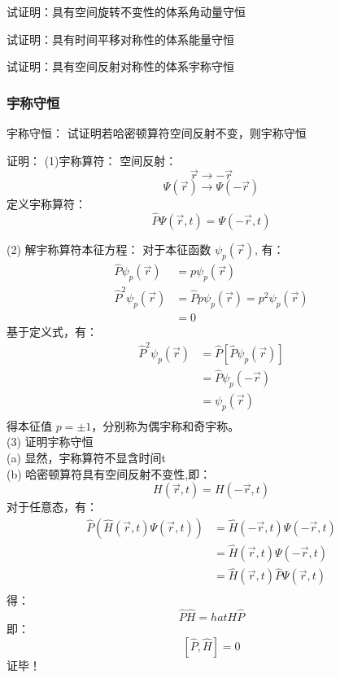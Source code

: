 \begin{frame} [allowframebreaks=]
    \frametitle{} 
    \begin{tcolorbox}[colback=yellow!5,colframe=yellow!75!black,title=角动量守恒：]
        试证明：具有空间旋转不变性的体系角动量守恒                               
    \end{tcolorbox}
    \begin{tcolorbox}[colback=yellow!5,colframe=yellow!75!black,title=能量守恒：]
        试证明：具有时间平移对称性的体系能量守恒                               
    \end{tcolorbox}
    \begin{tcolorbox}[colback=yellow!5,colframe=yellow!75!black,title=宇称守恒：]
        试证明：具有空间反射对称性的体系宇称守恒                             
    \end{tcolorbox}
\end{frame}

\begin{frame} [allowframebreaks=]
    \frametitle{宇称守恒} 
    \begin{tcolorbox1}{宇称守恒：}
        试证明若哈密顿算符空间反射不变，则宇称守恒                               
    \end{tcolorbox1}
    \alert{证明：} (1)宇称算符：
    空间反射：$$\vec{r} \to -\vec{r} $$
    $$\Psi(\vec{r}) \to \Psi(-\vec{r}) $$
    定义宇称算符： $$ \hat{P}\Psi(\vec{r},t) = \Psi(-\vec{r},t) $$
    
    (2) 解宇称算符本征方程： 
    对于本征函数 $\psi_p (\vec{r})$, 有：
    $$\begin{aligned}
        \hat{P}\psi_p (\vec{r}) &= p\psi_p (\vec{r}) \\
        \hat{P}^2\psi_p (\vec{r}) &= \hat{P} p\psi_p (\vec{r}) = p^2\psi_p (\vec{r})\\
        &= 0
    \end{aligned}$$
    基于定义式，有：
    $$\begin{aligned}
        \hat{P}^2\psi_p (\vec{r}) &= \hat{P} [\hat{P} \psi_p (\vec{r})]\\
        &= \hat{P} \psi_p (-\vec{r})\\
        &= \psi_p (\vec{r})\\
    \end{aligned}$$
    得本征值 $p=\pm 1$，分别称为偶宇称和奇宇称。\\
    (3) 证明宇称守恒 \\
    (a) 显然，宇称算符不显含时间t\\
    (b) 哈密顿算符具有空间反射不变性,即：
    $$ H(\vec{r},t)= H(-\vec{r},t)$$
    对于任意态，有：
    $$\begin{aligned}
        \hat{P} (\hat{H}(\vec{r},t) \Psi (\vec{r},t)) &= \hat{H}(-\vec{r},t) \Psi (-\vec{r},t)\\
        &= \hat{H}(\vec{r},t) \Psi (-\vec{r},t)\\
        &= \hat{H}(\vec{r},t) \hat{P} \Psi (\vec{r},t)\\
    \end{aligned}$$
    得： $$ \hat{P} \hat{H} = hat{H} \hat{P} $$
    即：$$[\hat{P}, \hat{H}]=0$$
    证毕！
\end{frame}

